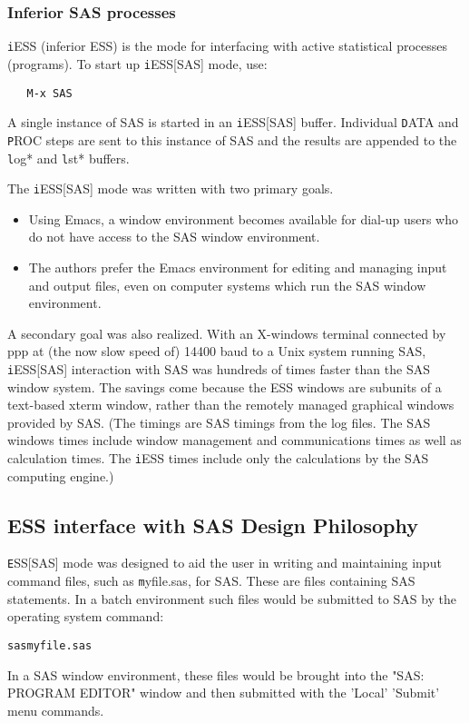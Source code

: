 \documentclass{article}
\newenvironment{Salltt}{\small\begin{alltt}}{\end{alltt}}
\begin{document}
\subsubsection{Inferior SAS processes}
\label{sec:SAS:proc:inf}

{\texttt iESS} (inferior ESS) is the mode for interfacing with active
statistical processes (programs).  To start up {\texttt iESS[SAS]} mode, use:
\begin{verbatim}
   M-x SAS
\end{verbatim}   
A single instance of SAS is started in an {\texttt iESS[SAS]} buffer.  Individual
{\texttt DATA} and {\texttt PROC} steps are sent to this instance of SAS and the results
are appended to the {\texttt *log*} and {\texttt *lst*} buffers.

The {\texttt iESS[SAS]} mode was written with two primary goals.
\begin{itemize}
\item Using Emacs, a window environment becomes available for dial-up
  users who do not have access to the SAS window environment.
\item The authors prefer the Emacs environment for editing and
  managing input and output files, even on computer systems which run
  the SAS window environment.
\end{itemize}
A secondary goal was also realized.  With an X-windows
terminal connected by ppp at (the now slow speed of)
14400 baud to a Unix system running SAS,
{\texttt iESS[SAS]} interaction with SAS was hundreds of times faster than the
SAS window system.  The savings come because the ESS windows are
subunits of a text-based xterm window, rather than the remotely
managed graphical windows provided by SAS.  (The timings are SAS
timings from the log files.  The SAS windows times include window
management and communications times as well as calculation times.  The
{\texttt iESS} times include only the calculations by the SAS computing engine.)


\subsection{ESS interface with SAS Design Philosophy}
\label{sec:SAS:phil}

{\texttt ESS[SAS]} mode was designed to aid the user in writing and maintaining
input command files, such as {\texttt myfile.sas}, for SAS.  These are files
containing SAS statements.  In a batch environment such files would be
submitted to SAS by the operating system command:
\begin{Salltt}
  sas myfile.sas
\end{Salltt}
In a SAS window environment, these files would be brought into the
"SAS: PROGRAM EDITOR" window and then submitted with the 'Local' 'Submit'
menu commands.
\end{document}

